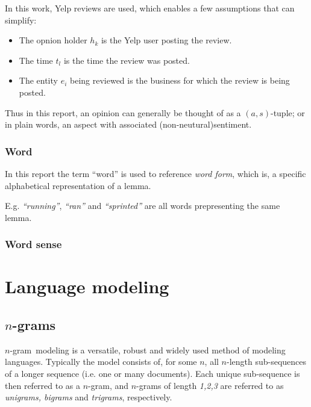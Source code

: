 \documentclass[a4paper,11pt]{kth-mag}
\newcommand{\ngram}{$n$-gram}
\begin{document}
In this work, Yelp reviews are used, which enables a few assumptions that can simplify:
\begin{itemize}
\item The opnion holder $h_k$ is the Yelp user posting the review.
\item The time $t_l$ is the time the review was posted.
\item The entity $e_i$ being reviewed is the business for which the review is being posted.
\end{itemize}

Thus in this report, an opinion can generally be thought of as a $(a,s)$-tuple; or in plain words, an aspect with associated (non-neutural)sentiment.

\subsubsection{Word}
In this report the term ``word'' is used to reference \emph{word form}, which is, a specific alphabetical representation of a lemma.

E.g. \emph{``running''}, \emph{``ran''} and \emph{``sprinted''} are all words prepresenting the same lemma.

\subsubsection{Word sense}

\section{Language modeling}

\subsection{\ngram s}
\ngram~modeling is a versatile, robust and widely used method of modeling languages. Typically the model consists of, for some $n$, all $n$-length sub-sequences of a longer sequence (i.e. one or many documents). Each unique sub-sequence is then referred to as a \ngram, and \ngram s of length \emph{1,2,3} are referred to as \emph{unigrams, bigrams} and \emph{trigrams}, respectively\cite{ngrams}.
\end{document}
